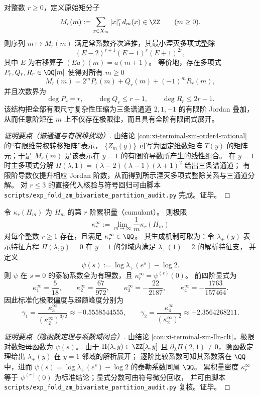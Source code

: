 \begin{conclusion}\label{con:xi-terminal-zm-mr-annihilator}
对整数 \(r\ge 0\)，定义原始矩分子
\[
M_r(m):=\sum_{x\in X_m}|x|_1^r\,d_m(x)\in\ZZ\qquad(m\ge 0).
\]
则序列 \(m\mapsto M_r(m)\) 满足常系数齐次递推，其最小湮灭多项式整除
\[
(E-2)^{r+1}(E-1)^r(E+1)^{2r},
\]
其中 \(E\) 为右移算子 \((Ea)(m)=a(m+1)\)。
等价地，存在多项式 \(P_r,Q_r,R_r\in\QQ[m]\) 使得对所有 \(m\ge 0\)
\[
M_r(m)=2^m P_r(m)+Q_r(m)+(-1)^m R_r(m),
\]
并且次数界为
\[
\deg P_r=r,\qquad \deg Q_r\le r-1,\qquad \deg R_r\le 2r-1.
\]
该结构把全部有限尺寸复杂性压缩为三条谱通道 \(2,1,-1\) 的有限阶 Jordan 叠加，从而任意阶矩在 \(m\) 上不仅存在极限律，而且具有全阶有限闭式展开。
\end{conclusion}
\begin{proof}[证明要点（谱通道与有限维扰动）]
由结论 \ref{con:xi-terminal-zm-order4-rational} 的“有限维带权转移矩阵”表示，
\(\{Z_m(y)\}\) 可写为固定维数矩阵 \(T(y)\) 的矩阵元；于是 \(M_r(m)\) 是该表示在 \(y=1\) 的有限阶导数所产生的线性组合。
在 \(y=1\) 时主多项式分解 \(\Pi(\lambda,1)=(\lambda-2)(\lambda-1)(\lambda+1)^2\) 给出三条谱通道；
有限阶导数仅提升相应 Jordan 阶数，从而得到所示湮灭多项式整除关系与三通道分解。
对 \(r\le 3\) 的直接代入核验与符号回归可由脚本 \texttt{scripts/exp\_fold\_zm\_bivariate\_partition\_audit.py} 完成。证毕。
\end{proof}

\begin{conclusion}\label{con:xi-terminal-zm-cumulant-rational}
令 \(\kappa_r(H_m)\) 为 \(H_m\) 的第 \(r\) 阶累积量（cumulant）。
则极限
\[
\kappa_r^\infty:=\lim_{m\to\infty}\frac{1}{m}\kappa_r(H_m)
\]
对每个整数 \(r\ge 1\) 存在，且满足 \(\kappa_r^\infty\in\QQ\)。
其生成机制可取为：令 \(\lambda_+(y)\) 表示特征方程 \(\Pi(\lambda,y)=0\) 在 \(y=1\) 的邻域内满足 \(\lambda_+(1)=2\) 的解析特征支，
并定义
\[
\psi(s):=\log\lambda_+(e^s)-\log 2.
\]
则 \(\psi\) 在 \(s=0\) 的泰勒系数全为有理数，且
\(
\kappa_r^\infty=\psi^{(r)}(0)
\)。
前四阶显式为
\[
\kappa_1^\infty=\frac{5}{18},\qquad
\kappa_2^\infty=\frac{67}{972},\qquad
\kappa_3^\infty=-\frac{22}{2187},\qquad
\kappa_4^\infty=-\frac{1763}{157464}.
\]
因此标准化极限偏度与超额峰度分别为
\[
\gamma_1=\frac{\kappa_3^\infty}{(\kappa_2^\infty)^{3/2}}\approx -0.5558544555,\qquad
\gamma_2=\frac{\kappa_4^\infty}{(\kappa_2^\infty)^2}\approx -2.3564268211.
\]
\end{conclusion}
\begin{proof}[证明要点（隐函数定理与系数域闭合）]
由结论 \ref{con:xi-terminal-zm-lln-clt}，极限对数矩母函数为 \(\psi(s)\)。
由于 \(\Pi(\lambda,y)\in\ZZ[\lambda,y]\) 且 \(\partial_\lambda\Pi(2,1)\neq 0\)，隐函数定理给出 \(\lambda_+(y)\) 在 \(y=1\) 邻域的解析展开；
逐阶比较系数可知其系数落在 \(\QQ\) 中，进而 \(\psi(s)=\log\lambda_+(e^s)-\log 2\) 的泰勒系数同属 \(\QQ\)。
累积量密度 \(\kappa_r^\infty\) 等于 \(\psi^{(r)}(0)\) 为标准结论；显式分数可由符号微分回收，
并可由脚本 \texttt{scripts/exp\_fold\_zm\_bivariate\_partition\_audit.py} 复核。证毕。
\end{proof}

